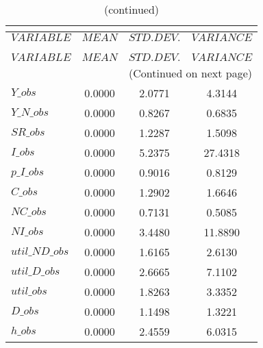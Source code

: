  
\begin{center}
\begin{longtable}{lccc} 
\caption{THEORETICAL MOMENTS}\\
 \label{Table:th_moments}\\
\toprule 
$VARIABLE       $	 & 	 $         MEAN$	 & 	 $    STD. DEV.$	 & 	 $     VARIANCE$\\
\midrule \endfirsthead 
\caption{(continued)}\\
 \toprule \\ 
$VARIABLE       $	 & 	 $         MEAN$	 & 	 $    STD. DEV.$	 & 	 $     VARIANCE$\\
\midrule \endhead 
\midrule \multicolumn{4}{r}{(Continued on next page)} \\ \bottomrule \endfoot 
\bottomrule \endlastfoot 
$Y\_obs         $	 & 	       0.0000	 & 	       2.0771	 & 	       4.3144 \\ 
$Y\_N\_obs      $	 & 	       0.0000	 & 	       0.8267	 & 	       0.6835 \\ 
$SR\_obs        $	 & 	       0.0000	 & 	       1.2287	 & 	       1.5098 \\ 
$I\_obs         $	 & 	       0.0000	 & 	       5.2375	 & 	      27.4318 \\ 
$p\_I\_obs      $	 & 	       0.0000	 & 	       0.9016	 & 	       0.8129 \\ 
$C\_obs         $	 & 	       0.0000	 & 	       1.2902	 & 	       1.6646 \\ 
$NC\_obs        $	 & 	       0.0000	 & 	       0.7131	 & 	       0.5085 \\ 
$NI\_obs        $	 & 	       0.0000	 & 	       3.4480	 & 	      11.8890 \\ 
$util\_ND\_obs  $	 & 	       0.0000	 & 	       1.6165	 & 	       2.6130 \\ 
$util\_D\_obs   $	 & 	       0.0000	 & 	       2.6665	 & 	       7.1102 \\ 
$util\_obs      $	 & 	       0.0000	 & 	       1.8263	 & 	       3.3352 \\ 
$D\_obs         $	 & 	       0.0000	 & 	       1.1498	 & 	       1.3221 \\ 
$h\_obs         $	 & 	       0.0000	 & 	       2.4559	 & 	       6.0315 \\ 
\end{longtable}
 \end{center}
